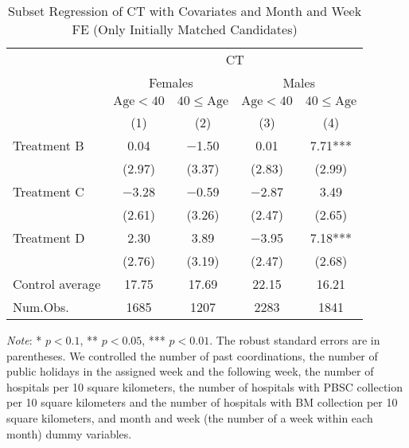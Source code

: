 \documentclass[12pt, a4paper]{article}
\begin{document}
\begin{table}[H]

\caption{\label{tab:lm-test-subset2-init}Subset Regression of CT with Covariates and Month and Week FE (Only Initially Matched Candidates)}
\centering
\fontsize{8}{10}\selectfont
\begin{threeparttable}
\begin{tabular}[t]{lcccc}
\toprule
\multicolumn{1}{c}{ } & \multicolumn{4}{c}{CT} \\
\cmidrule(l{3pt}r{3pt}){2-5}
\multicolumn{1}{c}{ } & \multicolumn{2}{c}{Females} & \multicolumn{2}{c}{Males} \\
\cmidrule(l{3pt}r{3pt}){2-3} \cmidrule(l{3pt}r{3pt}){4-5}
\multicolumn{1}{c}{ } & \multicolumn{1}{c}{$\text{Age} < 40$} & \multicolumn{1}{c}{$40 \le \text{Age}$} & \multicolumn{1}{c}{$\text{Age} < 40$} & \multicolumn{1}{c}{$40 \le \text{Age}$} \\
\cmidrule(l{3pt}r{3pt}){2-2} \cmidrule(l{3pt}r{3pt}){3-3} \cmidrule(l{3pt}r{3pt}){4-4} \cmidrule(l{3pt}r{3pt}){5-5}
  & (1) & (2) & (3) & (4)\\
\midrule
Treatment B & \num{0.04} & \num{-1.50} & \num{0.01} & \num{7.71}***\\
 & (\num{2.97}) & (\num{3.37}) & (\num{2.83}) & (\num{2.99})\\
Treatment C & \num{-3.28} & \num{-0.59} & \num{-2.87} & \num{3.49}\\
 & (\num{2.61}) & (\num{3.26}) & (\num{2.47}) & (\num{2.65})\\
Treatment D & \num{2.30} & \num{3.89} & \num{-3.95} & \num{7.18}***\\
 & (\num{2.76}) & (\num{3.19}) & (\num{2.47}) & (\num{2.68})\\
\midrule
Control average & 17.75 & 17.69 & 22.15 & 16.21\\
Num.Obs. & \num{1685} & \num{1207} & \num{2283} & \num{1841}\\
\bottomrule
\end{tabular}
\begin{tablenotes}
\item \emph{Note}: * $p < 0.1$, ** $p < 0.05$, *** $p < 0.01$. The robust standard errors are in parentheses. We controlled the number of past coordinations, the number of public holidays in the assigned week and the following week, the number of hospitals per 10 square kilometers, the number of hospitals with PBSC collection per 10 square kilometers and the number of hospitals with BM collection per 10 square kilometers, and month and week (the number of a week within each month) dummy variables.
\end{tablenotes}
\end{threeparttable}
\end{table}
\end{document}
